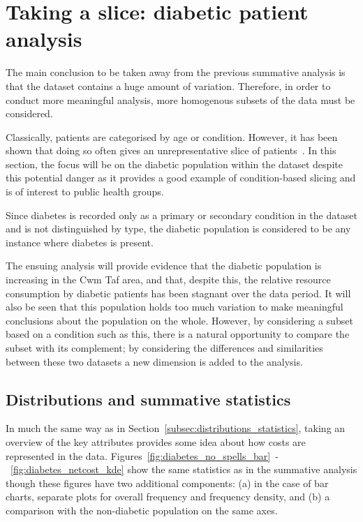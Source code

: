 \section{Taking a slice: diabetic patient analysis}\label{sec:diabetes}

The main conclusion to be taken away from the previous summative analysis is
that the dataset contains a huge amount of variation. Therefore, in order to
conduct more meaningful analysis, more homogenous subsets of the data must be
considered.

Classically, patients are categorised by age or condition. However, it has been
shown that doing so often gives an unrepresentative slice of
patients~\cite{Vuik2016}. In this section, the focus will be on the diabetic
population within the dataset despite this potential danger as it provides a
good example of condition-based slicing and is of interest to public health
groups.

Since diabetes is recorded only as a primary or secondary condition in the
dataset and is not distinguished by type, the diabetic population is considered
to be any instance where diabetes is present.

The ensuing analysis will provide evidence that the diabetic population is
increasing in the Cwm Taf area, and that, despite this, the relative resource
consumption by diabetic patients has been stagnant over the data period. It will
also be seen that this population holds too much variation to make meaningful 
conclusions about the population on the whole. However, by considering a subset
based on a condition such as this, there is a natural opportunity to compare
the subset with its complement; by considering the differences and similarities
between these two datasets a new dimension is added to the analysis.


\subsection{Distributions and summative statistics}%
\label{subsec:diabetes_distributions_statistics}

In much the same way as in Section~\ref{subsec:distributions_statistics}, taking
an overview of the key attributes provides some idea about how costs are
represented in the data.
Figures~\ref{fig:diabetes_no_spells_bar}~\--~\ref{fig:diabetes_netcost_kde} show
the same statistics as in the summative analysis though these figures have two
additional components: (a) in the case of bar charts, separate plots for overall
frequency and frequency density, and (b) a comparison with the non-diabetic
population on the same axes.

